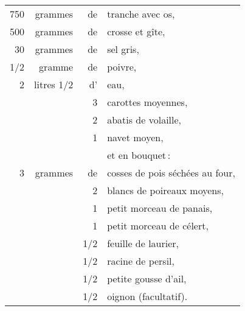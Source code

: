 \footnotesize
\begin{longtable}{rrrp{16em}}
  750 & grammes    & de  & tranche avec os,                                                               \\
  500 & grammes    & de  & crosse et gîte,                                                                \\
   30 & grammes    & de  & sel gris,                                                                      \\
  1/2 & gramme     & de  & poivre,                                                                        \\
    2 & litres 1/2 & d'  & eau,                                                                           \\
      &            &  3  & carottes moyennes,                                                             \\
      &            &  2  & abatis de volaille,                                                            \\
      &            &  1  & navet moyen,                                                                   \\
      &            &     & et en bouquet :                                                                \\
    3 & grammes    & de  & cosses de pois séchées au four,                                                \\
      &            &  2  & blancs de poireaux moyens,                                                     \\
      &            &  1  & petit morceau de panais,                                                       \\
      &            &  1  & petit morceau de célert,                                                       \\
      &            & 1/2 & feuille de laurier,                                                            \\
      &            & 1/2 & racine de persil,                                                              \\
      &            & 1/2 & petite gousse d'ail,                                                           \\
      &            & 1/2 & oignon (facultatif).                                                           \\
\end{longtable}
\normalsize                                

